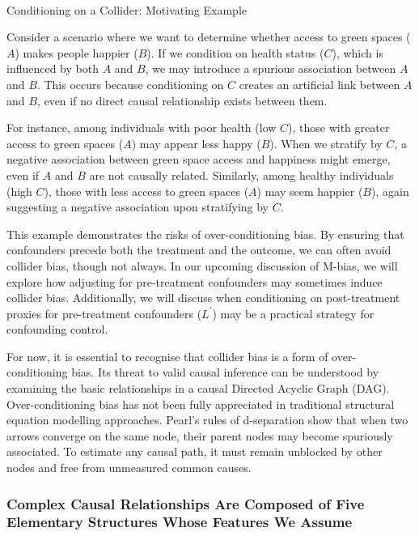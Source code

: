 \documentclass[
  singlecolumn]{article}
\makeatletter
\let\oldparagraph\paragraph
\renewcommand{\paragraph}{
    \@ifstar
      \xxxParagraphStar
      \xxxParagraphNoStar
  }
\newcommand{\xxxParagraphStar}[1]{\oldparagraph*{#1}\mbox{}}
\newcommand{\xxxParagraphNoStar}[1]{\oldparagraph{#1}\mbox{}}
\makeatother
\begin{document}
\paragraph{Conditioning on a Collider: Motivating
Example}\label{conditioning-on-a-collider-motivating-example}

Consider a scenario where we want to determine whether access to green
spaces (\(A\)) makes people happier (\(B\)). If we condition on health
status (\(C\)), which is influenced by both \(A\) and \(B\), we may
introduce a spurious association between \(A\) and \(B\). This occurs
because conditioning on \(C\) creates an artificial link between \(A\)
and \(B\), even if no direct causal relationship exists between them.

For instance, among individuals with poor health (low \(C\)), those with
greater access to green spaces (\(A\)) may appear less happy (\(B\)).
When we stratify by \(C\), a negative association between green space
access and happiness might emerge, even if \(A\) and \(B\) are not
causally related. Similarly, among healthy individuals (high \(C\)),
those with less access to green spaces (\(A\)) may seem happier (\(B\)),
again suggesting a negative association upon stratifying by \(C\).

This example demonstrates the risks of over-conditioning bias. By
ensuring that confounders precede both the treatment and the outcome, we
can often avoid collider bias, though not always. In our upcoming
discussion of M-bias, we will explore how adjusting for pre-treatment
confounders may sometimes induce collider bias. Additionally, we will
discuss when conditioning on post-treatment proxies for pre-treatment
confounders (\(L^\prime\)) may be a practical strategy for confounding
control.

For now, it is essential to recognise that collider bias is a form of
over-conditioning bias. Its threat to valid causal inference can be
understood by examining the basic relationships in a causal Directed
Acyclic Graph (DAG). Over-conditioning bias has not been fully
appreciated in traditional structural equation modelling approaches.
Pearl's rules of d-separation show that when two arrows converge on the
same node, their parent nodes may become spuriously associated. To
estimate any causal path, it must remain unblocked by other nodes and
free from unmeasured common causes.

\subsubsection{Complex Causal Relationships Are Composed of Five
Elementary Structures Whose Features We
Assume}\label{complex-causal-relationships-are-composed-of-five-elementary-structures-whose-features-we-assume}
\end{document}
